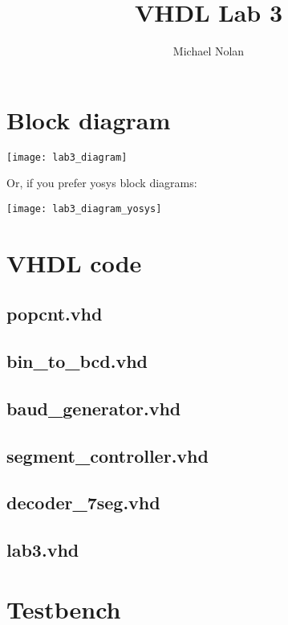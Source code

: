 \documentclass{article}
\title{VHDL Lab 3}
\author{Michael Nolan}
\begin{document}
\maketitle
\newpage

\section{Block diagram}

\texttt{[image: lab3\_diagram]}

Or, if you prefer yosys block diagrams:

\texttt{[image: lab3\_diagram\_yosys]}

\section{VHDL code}
\subsection{popcnt.vhd}


\subsection{bin\_to\_bcd.vhd}


\subsection{baud\_generator.vhd}


\subsection{segment\_controller.vhd}


\subsection{decoder\_7seg.vhd}


\subsection{lab3.vhd}


\newpage
\section{Testbench}
\end{document}
